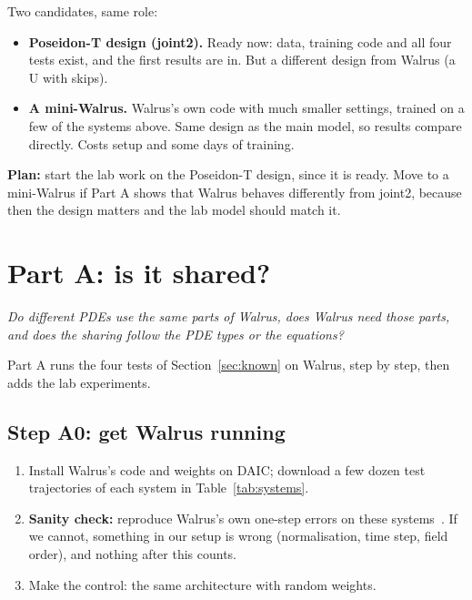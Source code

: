 \documentclass[11pt,a4paper]{article}
\newcommand{\question}[1]{%
  \vspace{0.4em}\begin{center}\begin{minipage}{0.85\textwidth}\setstretch{1.35}\large\itshape\color{ink}#1\end{minipage}\end{center}\vspace{0.5em}}
\begin{document}
Two candidates, same role:
\begin{itemize}[itemsep=0.6em]
  \item \textbf{Poseidon-T design (joint2).} Ready now: data, training code and all four tests exist, and the first results are in.
  But a different design from Walrus (a U with skips).
  \item \textbf{A mini-Walrus.} Walrus's own code with much smaller settings, trained on a few of the systems above.
  Same design as the main model, so results compare directly. Costs setup and some days of training.
\end{itemize}
\textbf{Plan:} start the lab work on the Poseidon-T design, since it is ready. Move to a mini-Walrus if Part A shows that Walrus
behaves differently from joint2, because then the design matters and the lab model should match it.

\section{Part A: is it shared?}
\label{sec:partA}

\question{Do different PDEs use the same parts of Walrus, does Walrus need those parts,
and does the sharing follow the PDE types or the equations?}

Part A runs the four tests of Section~\ref{sec:known} on Walrus, step by step, then adds the lab experiments.

\subsection*{Step A0: get Walrus running}

\begin{enumerate}[itemsep=0.5em]
  \item Install Walrus's code and weights on DAIC; download a few dozen test trajectories of each system in Table~\ref{tab:systems}.
  \item \textbf{Sanity check:} reproduce Walrus's own one-step errors on these systems~\cite{walrus}. If we cannot,
  something in our setup is wrong (normalisation, time step, field order), and nothing after this counts.
  \item Make the control: the same architecture with random weights.
\end{enumerate}
\end{document}
